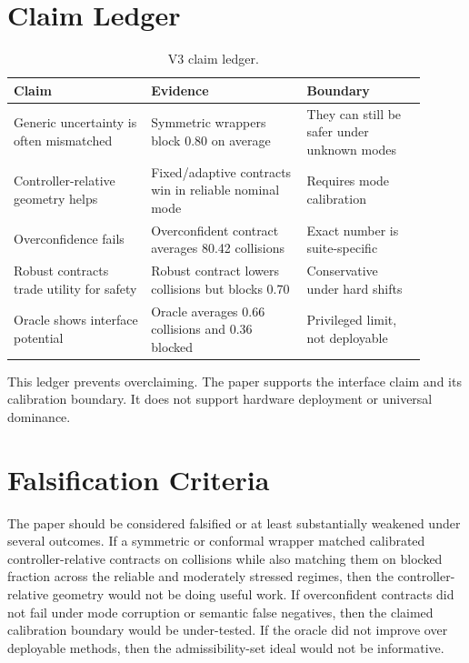 \documentclass{article}
\begin{document}
\section{Claim Ledger}

\begin{table}[h]
\centering
\small
\caption{V3 claim ledger.}
\begin{tabular}{p{0.30\linewidth}p{0.34\linewidth}p{0.26\linewidth}}
\toprule
Claim & Evidence & Boundary \\
\midrule
Generic uncertainty is often mismatched & Symmetric wrappers block 0.80 on average & They can still be safer under unknown modes \\
Controller-relative geometry helps & Fixed/adaptive contracts win in reliable nominal mode & Requires mode calibration \\
Overconfidence fails & Overconfident contract averages 80.42 collisions & Exact number is suite-specific \\
Robust contracts trade utility for safety & Robust contract lowers collisions but blocks 0.70 & Conservative under hard shifts \\
Oracle shows interface potential & Oracle averages 0.66 collisions and 0.36 blocked & Privileged limit, not deployable \\
\bottomrule
\end{tabular}
\end{table}

This ledger prevents overclaiming. The paper supports the interface claim and its calibration boundary. It does not support hardware deployment or universal dominance.

\section{Falsification Criteria}

The paper should be considered falsified or at least substantially weakened under several outcomes. If a symmetric or conformal wrapper matched calibrated controller-relative contracts on collisions while also matching them on blocked fraction across the reliable and moderately stressed regimes, then the controller-relative geometry would not be doing useful work. If overconfident contracts did not fail under mode corruption or semantic false negatives, then the claimed calibration boundary would be under-tested. If the oracle did not improve over deployable methods, then the admissibility-set ideal would not be informative.
\end{document}
